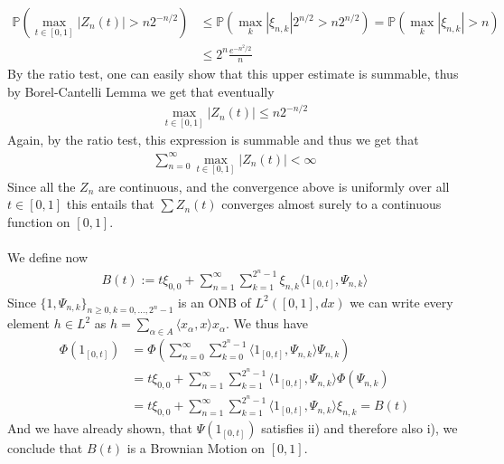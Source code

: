 \documentclass[11pt,a4paper, final]{article}
\theoremstyle{definition}
\begin{document}
\begin{align*}
\mathbb{P}( \max_{t \in [0,1]}| Z_n(t) | > n 2^{-n/2} ) &\leq  \mathbb{P}( \max_k | \xi_{n,k} | 2^{n/2} > n 2^{n/2} )  = \mathbb{P}( \max_{k} | \xi_{n,k} | >n )  \\
& \leq 2^n \frac{e ^{-n^2/2}}{n}
\end{align*}
By the ratio test, one can easily show that this upper estimate is summable, thus by Borel-Cantelli Lemma we get that eventually 
\begin{align*}
\max_{t \in [0,1]} |Z_n(t) | \leq n 2^{-n/2}
\end{align*}
Again, by the ratio test, this expression is summable and thus we get that 
\begin{align*}
\sum_{n=0}^\infty \max_{t \in [0,1]}  | Z_n(t)| < \infty 
\end{align*}
Since all the $Z_n$ are continuous, and the convergence above is uniformly over all $t \in [0,1]$ this entails that $\sum Z_n(t)$ converges almost surely to a continuous function on $[0,1]$. 
\\\\
We define now 
\begin{align*}
B(t):= t \xi_{0,0} + \sum_{n=1}^\infty  \sum_{k=1}^{2^n-1} \xi_{n,k} \langle 1_{[0,t]}, \Psi_{n,k} \rangle 
\end{align*}
Since $\lbrace 1, \Psi_{n,k} \rbrace_{n \geq 0, k =0, \dots , 2^n-1}$ is an ONB of $L^2([0,1], dx)$ we can write every element $h \in L^2$ as $h = \sum_{ \alpha \in A } \langle x_\alpha, x \rangle x_\alpha.$ We thus have
\begin{align*}
\Phi( 1_{[0,t]}) &= \Phi \left( \sum_{n=0}^\infty \sum_{k=0}^{2^n-1} \langle 1_{[0,t]}, \Psi_{n,k} \rangle \Psi_{n,k}  \right) \\
& = t \xi_{0,0} + \sum_{n=1}^\infty \sum_{k=1}^{2^n-1} \langle 1_{[0,t]}, \Psi_{n,k} \rangle \Phi \left( \Psi_{n,k} \right) \\
& = t \xi_{0,0} + \sum_{n=1}^\infty \sum_{k=1}^{2^n-1} \langle 1_{[0,t]}, \Psi_{n,k} \rangle \xi_{n,k}  = B(t)
\end{align*}
And we have already shown, that $\Psi(1_{[0,t]})$ satisfies ii) and therefore also i), we conclude that $B(t)$ is a Brownian Motion on $[0,1]$. 
\end{document}
